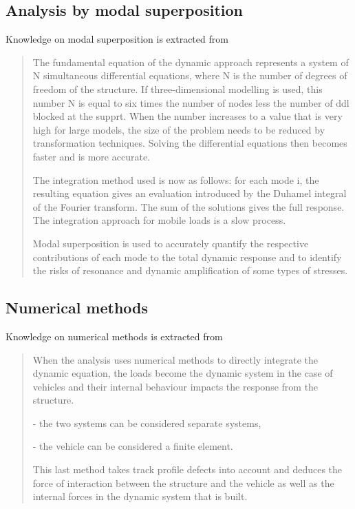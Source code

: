 \begin{appendices}
\begin{quote}
\end{quote}

\subsection{Analysis by modal superposition}

Knowledge on modal superposition is extracted from \citet{UIC776-2}

\begin{quote}
The fundamental equation of the dynamic approach represents a system of N simultaneous differential equations, where N is the number of degrees of freedom of the structure. If three-dimensional modelling is used, this number N is equal to six times the number of nodes less the number of ddl blocked at the supprt. When the number increases to a value that is very high for large models, the size of the problem needs to be reduced by transformation techniques. Solving the differential equations then becomes faster and is more accurate.

The integration method used is now as follows: for each mode i, the resulting equation gives an evaluation introduced by the Duhamel integral of the Fourier transform. The sum of the solutions gives the full response. The integration approach for mobile loads is a slow process.

Modal superposition is used to accurately quantify the respective contributions of each mode to the total dynamic response and to identify the risks of resonance and dynamic amplification of some types of stresses.
\end{quote}

\subsection{Numerical methods}

Knowledge on numerical methods is extracted from \citet{UIC776-2}

\begin{quote}

When the analysis uses numerical methods to directly integrate the dynamic equation, the loads become the dynamic system in the case of vehicles and their internal behaviour impacts the response from the structure.

- the two systems can be considered separate systems,

- the vehicle can be considered a finite element.

This last method takes track profile defects into account and deduces the force of interaction between the structure and the vehicle as well as the internal forces in the dynamic system that is built.


\end{quote}
\end{appendices}

